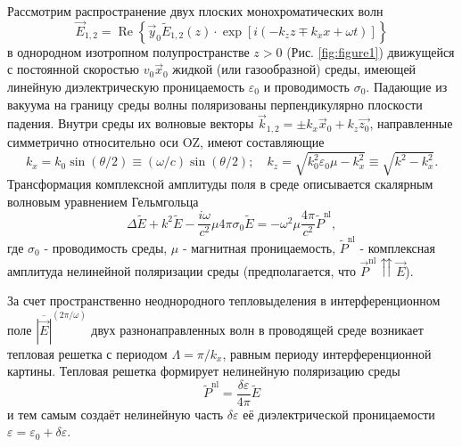 Рассмотрим распространение двух плоских монохроматических волн
\begin{equation}
	\label{eq:pdv.1}
	\vec{E}_{1,2}=\operatorname{Re}\left\{\vec{y}_{0} \tilde{E}_{1,2}(z) \cdot \exp \left[i\left(-k_{z} z \mp k_{x} x+\omega t\right)\right]\right\}
\end{equation}
в однородном изотропном полупространстве $z>0$ (Рис. \ref{fig:figure1}) движущейся с постоянной скоростью $v_0 \vec{x}_0$ жидкой (или газообразной) среды, имеющей линейную диэлектрическую проницаемость $\varepsilon_0$ и проводимость $\sigma_0$. Падающие из вакуума на границу среды волны поляризованы перпендикулярно плоскости падения. Внутри среды их волновые векторы $\vec{k}_{1,2} = \pm k_x \vec{x}_0 + k_z \vec{z_0}$, направленные симметрично относительно оси OZ, имеют составляющие
\begin{equation}
	\label{eq:pdv.2}
	k_{x}=k_{0} \sin (\theta / 2) \equiv(\omega / c) \sin (\theta / 2) ; \quad k_{z}=\sqrt{k_{0}^{2} \varepsilon_{0} \mu-k_{x}^{2}} \equiv \sqrt{k^{2}-k_{x}^{2}}.
\end{equation}
Трансформация комплексной амплитуды поля в среде описывается скалярным волновым уравнением Гельмгольца
\begin{equation}
	\label{eq:pdv.3}
	\Delta \tilde{E}+k^{2} \tilde{E}-\frac{i \omega}{c^{2}} \mu 4 \pi \sigma_{0} \tilde{E}=-\omega^{2} \mu \frac{4 \pi}{c^{2}} \tilde{P}^\text{nl},
\end{equation}
где $\sigma_{0}$ - проводимость среды, $\mu$ - магнитная проницаемость, $\tilde{P}^\text{nl}$ - комплексная амплитуда нелинейной поляризации среды (предполагается, что $\vec{P}^\text{nl} \upuparrows \vec{E}$).

За счет пространственно неоднородного тепловыделения в интерференционном поле $\overline{|\vec{E}|}^{({2\pi}/{\omega})}$ двух разнонаправленных волн в проводящей среде возникает тепловая решетка с периодом $\Lambda = \pi / k_x$, равным периоду интерференционной картины. Тепловая решетка формирует нелинейную поляризацию среды
\begin{equation}
	\label{eq:pdv.4}
	\tilde{P}^\text{nl}=\frac{\delta \varepsilon}{4 \pi} \tilde{E}
\end{equation}
и тем самым создаёт нелинейную часть $\delta \varepsilon$ её диэлектрической проницаемости $\varepsilon = \varepsilon_0 + \delta\varepsilon$.


